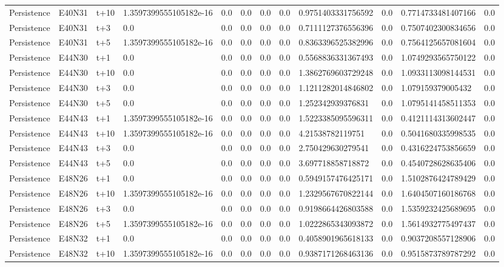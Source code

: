 \begin{landscape}
\begin{longtable}{llllllllllll}
Persistence & E40N31 & t+10 & 1.3597399555105182e-16 & 0.0 & 0.0 & 0.0 & 0.0 & 0.9751403331756592 & 0.0 & 0.7714733481407166 & 0.0 \\
Persistence & E40N31 & t+3 & 0.0 & 0.0 & 0.0 & 0.0 & 0.0 & 0.7111127376556396 & 0.0 & 0.7507402300834656 & 0.0 \\
Persistence & E40N31 & t+5 & 1.3597399555105182e-16 & 0.0 & 0.0 & 0.0 & 0.0 & 0.8363396525382996 & 0.0 & 0.7564125657081604 & 0.0 \\
Persistence & E44N30 & t+1 & 0.0 & 0.0 & 0.0 & 0.0 & 0.0 & 0.5568836331367493 & 0.0 & 1.0749293565750122 & 0.0 \\
Persistence & E44N30 & t+10 & 0.0 & 0.0 & 0.0 & 0.0 & 0.0 & 1.3862769603729248 & 0.0 & 1.0933113098144531 & 0.0 \\
Persistence & E44N30 & t+3 & 0.0 & 0.0 & 0.0 & 0.0 & 0.0 & 1.1211282014846802 & 0.0 & 1.079159379005432 & 0.0 \\
Persistence & E44N30 & t+5 & 0.0 & 0.0 & 0.0 & 0.0 & 0.0 & 1.252342939376831 & 0.0 & 1.0795141458511353 & 0.0 \\
Persistence & E44N43 & t+1 & 1.3597399555105182e-16 & 0.0 & 0.0 & 0.0 & 0.0 & 1.5223385095596311 & 0.0 & 0.4121114313602447 & 0.0 \\
Persistence & E44N43 & t+10 & 1.3597399555105182e-16 & 0.0 & 0.0 & 0.0 & 0.0 & 4.21538782119751 & 0.0 & 0.5041680335998535 & 0.0 \\
Persistence & E44N43 & t+3 & 0.0 & 0.0 & 0.0 & 0.0 & 0.0 & 2.750429630279541 & 0.0 & 0.4316224753856659 & 0.0 \\
Persistence & E44N43 & t+5 & 0.0 & 0.0 & 0.0 & 0.0 & 0.0 & 3.697718858718872 & 0.0 & 0.4540728628635406 & 0.0 \\
Persistence & E48N26 & t+1 & 0.0 & 0.0 & 0.0 & 0.0 & 0.0 & 0.5949157476425171 & 0.0 & 1.5102876424789429 & 0.0 \\
Persistence & E48N26 & t+10 & 1.3597399555105182e-16 & 0.0 & 0.0 & 0.0 & 0.0 & 1.2329567670822144 & 0.0 & 1.6404507160186768 & 0.0 \\
Persistence & E48N26 & t+3 & 0.0 & 0.0 & 0.0 & 0.0 & 0.0 & 0.9198664426803588 & 0.0 & 1.5359232425689695 & 0.0 \\
Persistence & E48N26 & t+5 & 1.3597399555105182e-16 & 0.0 & 0.0 & 0.0 & 0.0 & 1.0222865343093872 & 0.0 & 1.5614932775497437 & 0.0 \\
Persistence & E48N32 & t+1 & 0.0 & 0.0 & 0.0 & 0.0 & 0.0 & 0.4058901965618133 & 0.0 & 0.9037208557128906 & 0.0 \\
Persistence & E48N32 & t+10 & 1.3597399555105182e-16 & 0.0 & 0.0 & 0.0 & 0.0 & 0.9387171268463136 & 0.0 & 0.9515873789787292 & 0.0 \\

\end{longtable}
\end{landscape}
